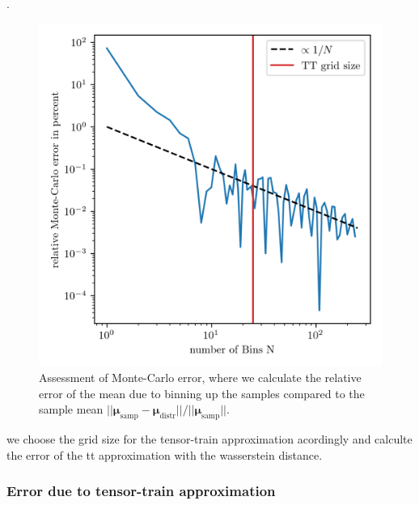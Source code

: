 .\begin{figure}[ht!]
	\centering
	\includegraphics{MeanAssPT.png}
	\caption[Assessment of Monte-Carlo error.]{Assessment of Monte-Carlo error, where we calculate the relative error of the mean due to binning up the samples compared to the sample mean $||\bm{\mu}_{\text{samp}} -\bm{\mu}_{\text{distr}} ||/ || \bm{\mu}_{\text{samp}}||$.}
	\label{fig:MCError}
\end{figure}
we choose the grid size for the tensor-train approximation acordingly and calculte the error of the tt approximation with the wasserstein distance.

\subsubsection{Error due to tensor-train approximation}